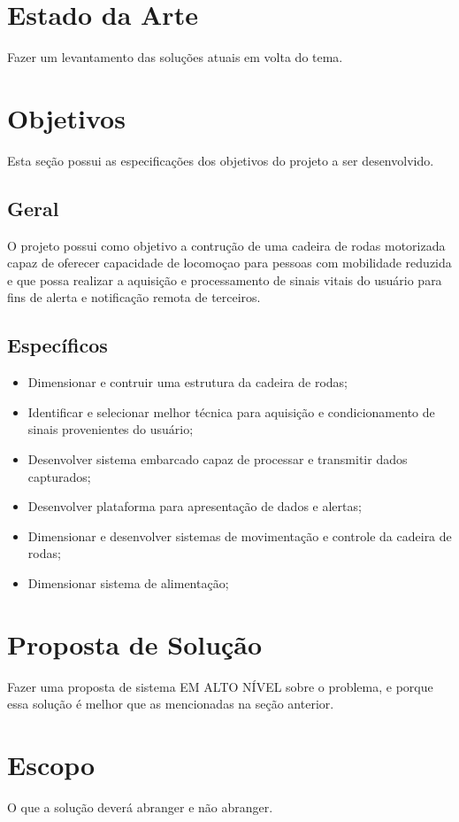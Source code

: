 \section{Estado da Arte}

Fazer um levantamento das soluções atuais em volta do tema.

\section{Objetivos}
Esta seção possui as especificações dos objetivos do projeto a ser desenvolvido.

\subsection{Geral}
O projeto possui como objetivo a contrução de uma cadeira de rodas motorizada capaz de
oferecer capacidade de locomoçao para pessoas com mobilidade reduzida
e que possa realizar
a aquisição e processamento de sinais vitais do usuário para fins de alerta e notificação
remota de terceiros.

\subsection{Específicos}

\begin{itemize}
\item Dimensionar e contruir uma estrutura da cadeira de rodas;
\item Identificar e selecionar melhor técnica para aquisição e condicionamento de sinais provenientes do usuário;
\item Desenvolver sistema embarcado capaz de processar e transmitir dados capturados;
\item Desenvolver plataforma para apresentação de dados e alertas;
\item Dimensionar e desenvolver sistemas de movimentação e controle da cadeira de rodas;
\item Dimensionar sistema de alimentação;
\end{itemize}

\section{Proposta de Solução}

Fazer uma proposta de sistema EM ALTO NÍVEL sobre o problema, e porque essa solução é melhor que as mencionadas na seção anterior.

\section{Escopo}

O que a solução deverá abranger e não abranger.
